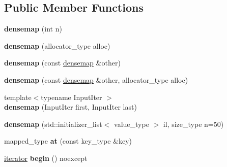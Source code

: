 \subsection*{Public Member Functions}
\begin{DoxyCompactItemize}
\item 
\hypertarget{classtheoria_1_1util_1_1densemap_a28dea7cc32d7cee72cf330bdf3e3201c}{{\bfseries densemap} (int n)}\label{classtheoria_1_1util_1_1densemap_a28dea7cc32d7cee72cf330bdf3e3201c}

\item 
\hypertarget{classtheoria_1_1util_1_1densemap_a4c32897f404f44c7de730637d09e18d5}{{\bfseries densemap} (allocator\+\_\+type alloc)}\label{classtheoria_1_1util_1_1densemap_a4c32897f404f44c7de730637d09e18d5}

\item 
\hypertarget{classtheoria_1_1util_1_1densemap_a8c6d546ba72e0516685424cb5c4c2467}{{\bfseries densemap} (const \hyperlink{classtheoria_1_1util_1_1densemap}{densemap} \&other)}\label{classtheoria_1_1util_1_1densemap_a8c6d546ba72e0516685424cb5c4c2467}

\item 
\hypertarget{classtheoria_1_1util_1_1densemap_ae8cbc01dc2418bffff40319a80df81e7}{{\bfseries densemap} (const \hyperlink{classtheoria_1_1util_1_1densemap}{densemap} \&other, allocator\+\_\+type alloc)}\label{classtheoria_1_1util_1_1densemap_ae8cbc01dc2418bffff40319a80df81e7}

\item 
\hypertarget{classtheoria_1_1util_1_1densemap_abd0a8736cb03cb0e4bbc7489a5274c78}{{\footnotesize template$<$typename Input\+Iter $>$ }\\{\bfseries densemap} (Input\+Iter first, Input\+Iter last)}\label{classtheoria_1_1util_1_1densemap_abd0a8736cb03cb0e4bbc7489a5274c78}

\item 
\hypertarget{classtheoria_1_1util_1_1densemap_a2fbff5aaf475fbd8492c9c766614517b}{{\bfseries densemap} (std\+::initializer\+\_\+list$<$ value\+\_\+type $>$ il, size\+\_\+type n=50)}\label{classtheoria_1_1util_1_1densemap_a2fbff5aaf475fbd8492c9c766614517b}

\item 
\hypertarget{classtheoria_1_1util_1_1densemap_a8205a6321acfcf7492c71c4912c348df}{mapped\+\_\+type {\bfseries at} (const key\+\_\+type \&key)}\label{classtheoria_1_1util_1_1densemap_a8205a6321acfcf7492c71c4912c348df}

\item 
\hypertarget{classtheoria_1_1util_1_1densemap_a511286991ffa72b606d52ae74668d5fe}{\hyperlink{classtheoria_1_1util_1_1densemap_1_1Iter}{iterator} {\bfseries begin} () noexcept}\label{classtheoria_1_1util_1_1densemap_a511286991ffa72b606d52ae74668d5fe}


\end{DoxyCompactItemize}
